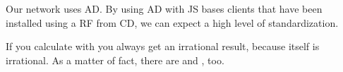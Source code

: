 \documentclass{article}
\newcommand{\citez}[1]{#1\protect\nocite{#1}}
\begin{document}
Our network uses \citez{AD}. By using \citez{AD} with \citez{JS} bases clients that have been installed using a \citez{RF} from \citez{CD}, we can expect a high level of standardization.

If you calculate with \cite{sym:pi} you always get an irrational result, because \cite{sym:pi} itself is irrational. As a matter of fact, there are \cite{sym:phi} and \cite{sym:lambda}, too.



\end{document}

